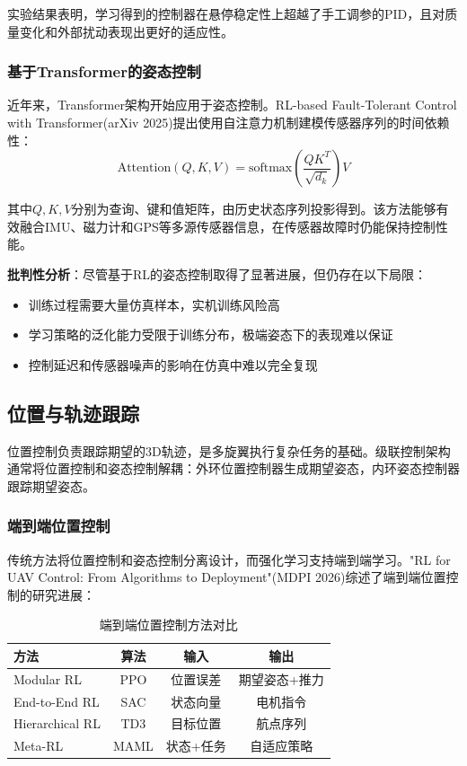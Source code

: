 \documentclass[12pt,a4paper]{ctexart}
\begin{document}
实验结果表明，学习得到的控制器在悬停稳定性上超越了手工调参的PID，且对质量变化和外部扰动表现出更好的适应性。

\subsubsection{基于Transformer的姿态控制}

近年来，Transformer架构开始应用于姿态控制。RL-based Fault-Tolerant Control with Transformer(arXiv 2025)提出使用自注意力机制建模传感器序列的时间依赖性：
\begin{equation}
    \text{Attention}(Q, K, V) = \text{softmax}\left(\frac{QK^T}{\sqrt{d_k}}\right)V
\end{equation}

其中$Q, K, V$分别为查询、键和值矩阵，由历史状态序列投影得到。该方法能够有效融合IMU、磁力计和GPS等多源传感器信息，在传感器故障时仍能保持控制性能。

\textbf{批判性分析}：尽管基于RL的姿态控制取得了显著进展，但仍存在以下局限：
\begin{itemize}
    \item 训练过程需要大量仿真样本，实机训练风险高
    \item 学习策略的泛化能力受限于训练分布，极端姿态下的表现难以保证
    \item 控制延迟和传感器噪声的影响在仿真中难以完全复现
\end{itemize}

\subsection{位置与轨迹跟踪}

位置控制负责跟踪期望的3D轨迹，是多旋翼执行复杂任务的基础。级联控制架构通常将位置控制和姿态控制解耦：外环位置控制器生成期望姿态，内环姿态控制器跟踪期望姿态。

\subsubsection{端到端位置控制}

传统方法将位置控制和姿态控制分离设计，而强化学习支持端到端学习。"RL for UAV Control: From Algorithms to Deployment"(MDPI 2026)综述了端到端位置控制的研究进展：

\begin{table}[htbp]
\centering
\caption{端到端位置控制方法对比}
\label{tab:position_control}
\begin{tabular}{@{}lccc@{}}
\toprule
\textbf{方法} & \textbf{算法} & \textbf{输入} & \textbf{输出} \\
\midrule
Modular RL & PPO & 位置误差 & 期望姿态+推力 \\
End-to-End RL & SAC & 状态向量 & 电机指令 \\
Hierarchical RL & TD3 & 目标位置 & 航点序列 \\
Meta-RL & MAML & 状态+任务 & 自适应策略 \\
\bottomrule
\end{tabular}
\end{table}
\end{document}
